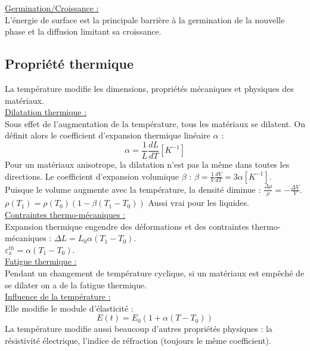 \documentclass[../main.tex]{subfiles}
\begin{document}
\quad \underline{Germination/Croissance :}\\
L'énergie de surface est la principale barrière à la germination de la nouvelle phase et la diffusion limitant sa croissance.\\

\subsection{Propriété thermique}
La température modifie les dimensions, propriétés mécaniques et physiques des matériaux. \\

\quad \underline{Dilatation thermique :}\\
Sous effet de l'augmentation de la température, tous les matériaux se dilatent. On définit alors le coefficient d'expansion thermique linéaire $\alpha$ : \\
\begin{equation}
    \alpha = \frac{1}{L} \frac{dL}{dT} [K^{-1}]
\end{equation}
Pour un matériaux anisotrope, la dilatation n'est pas la même dans toutes les directions. Le coefficient d'expansion volumique $\beta$ : $\beta = \frac{1}{V} \frac{dV}{dT} = 3\alpha [K^{-1}]$.\\
Puisque le volume augmente avec la température, la densité diminue : $\frac{\Delta \rho}{\rho} = -\frac{\Delta V}{V}$.\\
$\rho (T_1) = \rho (T_0)(1-\beta (T_1 - T_0))$ Aussi vrai pour les liquides. \\

\quad \underline{Contraintes thermo-mécaniques :}\\
Expansion thermique engendre des déformations et des contraintes thermo-mécaniques : $\Delta L = L_0 \alpha (T_1 - T_0)$.\\

$\varepsilon_x^{th} = \alpha (T_1 -T_0)$.\\

\quad \underline{Fatigue thermique :}\\
Pendant un changement de température cyclique, si un matériaux est empêché de se dilater on a de la fatigue thermique.\\

\quad \underline{Influence de la température :}\\
Elle modifie le module d'élasticité : \\
\begin{equation}
    E(t) = E_0(1+\alpha(T-T_0))
\end{equation}
La température modifie aussi beaucoup d'autres propriétés physiques : la résistivité électrique, l'indice de réfraction (toujours le même coefficient).\\
\end{document}
